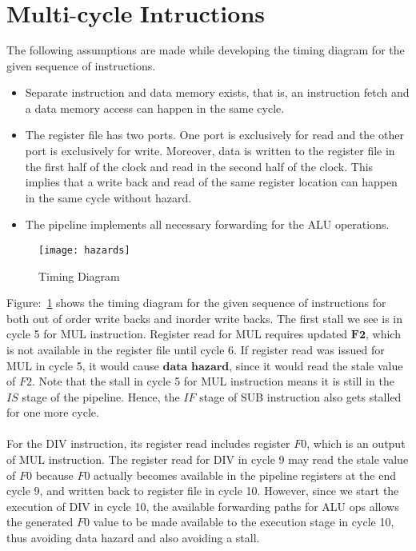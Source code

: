 \documentclass{tufte-handout}
\begin{document}
  \section{$\textbf{Multi-cycle Intructions}$}
  The following assumptions are made while developing the timing diagram for the given sequence of instructions.
  \begin{itemize}
  	\item Separate instruction and data memory exists, that is, an instruction fetch and a data memory access can happen in the same cycle.
	\item The register file has two ports. One port is exclusively for read and the other port is exclusively for write. Moreover, data is written to the register file in the first half of the clock and read in the second half of the clock. This implies that a write back and read of the same register location can happen in the same cycle without hazard.
	\item The pipeline implements all necessary forwarding for the ALU operations. 
  \end{itemize}
	\begin{figure}[h!]
	\label{fig:hazard}
	\centering
	\texttt{[image: hazards]}
	\caption{Timing Diagram}
	\end{figure}

	Figure:~\ref{fig:hazard} shows the timing diagram for the given sequence of instructions for both out of order write backs and inorder write backs. The first stall we see is in cycle 5 for MUL instruction. Register read for MUL requires updated $\textbf{F2}$, which is not available in the register file until cycle 6. If register read was issued for MUL in cycle 5, it would cause $\textbf{data hazard}$, since it would read the stale value of $F2$. Note that the stall in cycle 5 for MUL instruction means it is still in the $IS$ stage of the pipeline. Hence, the $IF$ stage of SUB instruction also gets stalled for one more cycle.
	\paragraph{} For the DIV instruction, its register read includes register $F0$, which is an output of MUL instruction.  The register read for DIV in cycle 9 may read the stale value of $F0$ because $F0$ actually becomes available in the pipeline registers at the end cycle 9, and written back to register file in cycle 10. However, since we start the execution of DIV in cycle 10, the available forwarding paths for ALU ops allows the generated $F0$ value to be made available to the execution stage in cycle 10, thus avoiding data hazard and also avoiding a stall.
\end{document}
